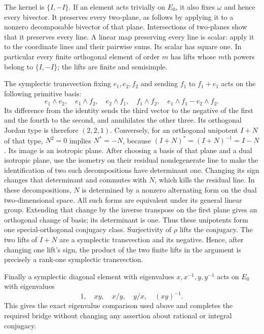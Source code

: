 The kernel is $\{I,-I\}$. If an element acts trivially on
$E_0$, it also fixes $\omega$ and hence every bivector.
It preserves every two-plane, as follows by applying it to a
nonzero decomposable bivector of that plane. Intersections of
two-planes show that it preserves every line. A linear map
preserving every line is scalar: apply it to the coordinate lines
and their pairwise sums. Its scalar has square one. In particular
every finite orthogonal element of order $m$ has lifts whose
$m$th powers belong to $\{I,-I\}$; the lifts are finite and
semisimple.

The symplectic transvection fixing $e_1,e_2,f_2$ and sending
$f_1$ to $f_1+e_1$ acts on the following primitive basis:
\[
 e_1\wedge e_2,\quad e_1\wedge f_2,\quad
 e_2\wedge f_1,\quad f_1\wedge f_2,\quad
 e_1\wedge f_1-e_2\wedge f_2.
\]
Its difference from the identity sends the third vector to
the negative of the first and the fourth to the second, and
annihilates the other three. Its orthogonal Jordan type is
therefore $(2,2,1)$. Conversely, for an orthogonal unipotent
$I+N$ of that type, $N^2=0$ implies $N^*=-N$, because
$(I+N)^*=(I+N)^{-1}=I-N$. Its image is an isotropic plane.
After choosing a basis of that plane and a dual isotropic
plane, use the isometry on their residual nondegenerate line
to make the identification of two such decompositions have
determinant one. Changing its sign changes that determinant
and commutes with $N$, which kills the residual line.
In these decompositions, $N$ is determined by a nonzero alternating form on
the dual two-dimensional space. All such forms are equivalent
under its general linear group. Extending that change by the
inverse transpose on the first plane gives an orthogonal
change of basis; its determinant is one. Thus these unipotents
form one special-orthogonal conjugacy class. Surjectivity of
$\rho$ lifts the conjugacy. The two lifts of $I+N$ are a
symplectic transvection and its negative. Hence, after changing
one lift's sign, the product of the two finite lifts in the
argument is precisely a rank-one symplectic transvection.

Finally a symplectic diagonal element with eigenvalues
$x,x^{-1},y,y^{-1}$ acts on $E_0$ with eigenvalues
\[
 1,\quad xy,\quad x/y,\quad y/x,\quad (xy)^{-1}.
\]
This gives the exact eigenvalue comparison used above and
completes the required bridge without changing any assertion
about rational or integral conjugacy.
